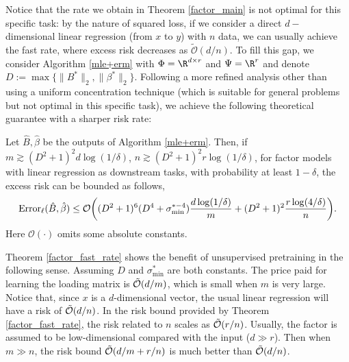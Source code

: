 Notice that the rate we obtain in Theorem \ref{factor_main} is not optimal for this specific task: by the nature of squared loss, if we consider a direct $d-$dimensional linear regression (from $x$ to $y$) with $n$ data, we can usually achieve the fast rate, where excess risk decreases as $\tilde{\mathcal{O}}(d/n)$. To fill this gap, we consider Algorithm \ref{mle+erm} with $\Phi=\R^{d\times r}$ and $\Psi=\R^{r}$ and denote $D:=\max\{\|B^* \|_2,\|\beta^* \|_2\}$. Following a more refined analysis other than using a uniform concentration technique (which is suitable for general problems but not optimal in this specific task), we achieve the following theoretical guarantee with a sharper risk rate: 


\begin{theorem} \label{factor_fast_rate}
Let $\hat B, \hat\beta$ be the outputs of Algorithm \ref{mle+erm}. Then, if $m \gtrsim (D^{2}+1)^{2} d \log (1/\delta)$, $n \gtrsim (D^{2}+1)^{2} r \log (1/\delta)$, for factor models with linear regression as downstream tasks, with probability at least $1-\delta$, the excess risk can be bounded as follows, 
\begin{align*}
{\rm Error}_{\ell}(\hat B,\hat\beta) \leq \mathcal{O} \bigg((D^{2}+1)^{6}(D^{4}+\sigma_{\min}^{* -4})\frac{d \log (1/\delta)}{m}+ (D^{2}+1)^{2}\frac{r \log(4/\delta)}{n }\bigg).
\end{align*}
Here $\mathcal{O}(\cdot)$ omits some absolute constants.
\end{theorem}


Theorem \ref{factor_fast_rate} shows the benefit of unsupervised pretraining in the following sense. Assuming $D$ and $\sigma^{*}_{\min}$ are both constants. The price paid for learning the loading matrix is $\Tilde{\mathcal{O}}(d/m) $, which is small when $m$ is very large. Notice that, since $x$ is a $d$-dimensional vector, the usual linear regression will have a risk of $\Tilde{\mathcal{O}}(d/n)$. In the risk bound provided by Theorem \ref{factor_fast_rate},  the risk related to $n$ scales as $\Tilde{\mathcal{O}}(r/n)$. Usually, the factor is assumed to be low-dimensional compared with the input ($d \gg r$). Then when $m \gg n$, the risk bound $\Tilde{\mathcal{O}}(d/m + r/n)$ is much better than $\Tilde{\mathcal{O}}(d/n)$.


